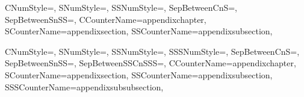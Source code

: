 {  %
  {%
    CNumStyle=\GetAppendixSSTitleNumberFormatCNumStyle,%
    SNumStyle=\GetAppendixSSTitleNumberFormatSNumStyle,%
    SSNumStyle=\GetAppendixSSTitleNumberFormatSSNumStyle,%
    SepBetweenCnS=\GetAppendixSSTitleNumberFormatSepBetweenCnS,%
    SepBetweenSnSS=\GetAppendixSSTitleNumberFormatSepBetweenSnSS,%
    CCounterName=appendixchapter,%
    SCounterName=appendixsection,%
    SSCounterName=appendixsubsection,%
  }{\GetAppendixSubSectionNumberingFormatString}%

  {%
    CNumStyle=\GetAppendixSSSTitleNumberFormatCNumStyle,%
    SNumStyle=\GetAppendixSSSTitleNumberFormatSNumStyle,%
    SSNumStyle=\GetAppendixSSSTitleNumberFormatSSNumStyle,%
    SSSNumStyle=\GetAppendixSSSTitleNumberFormatSSSNumStyle,%
    SepBetweenCnS=\GetAppendixSSSTitleNumberFormatSepBetweenCnS,%
    SepBetweenSnSS=\GetAppendixSSSTitleNumberFormatSepBetweenSnSS,%
    SepBetweenSSCnSSS=\GetAppendixSSSTitleNumberFormatSepBetweenSSCnSSS,%
    CCounterName=appendixchapter,%
    SCounterName=appendixsection,%
    SSCounterName=appendixsubsection,%
    SSSCounterName=appendixsubsubsection,%
  }{\GetAppendixSubSubSectionNumberingFormatString}%
} %


\newcommand\SetupFTENumberFormat
{%
  \SetupGeneralFigureNumberFormatString%
  \SetupGeneralTableNumberFormatString%
  \SetupGeneralEquationNumberFormatString%
  \renewcommand{\thefigure}{\GetGeneralFigureNumberFormatString}%
  \renewcommand{\thetable}{\GetGeneralTableNumberFormatString}%
  \renewcommand{\theequation}{\GetGeneralEquationNumberFormatString}%
} %

\newcommand\SetupAppendixFTENumberFormat
{%
  \SetupAppendixFigureNumberFormatString%
  \SetupAppendixTableNumberFormatString%
  \SetupAppendixEquationNumberFormatString%
  \renewcommand{\thefigure}{\GetAppendixFigureNumberFormatString}
  \renewcommand{\thetable}{\GetAppendixTableNumberFormatString}
  \renewcommand{\theequation}{\GetAppendixEquationNumberFormatString}
} %


\newcommand\SetupNumberingFormat
{%
  \SetupFTENumberFormat%
} %

